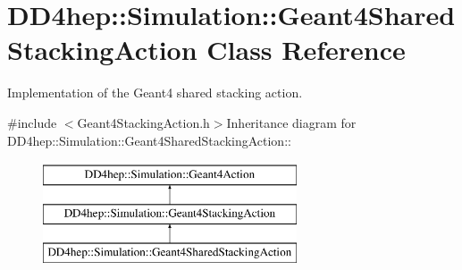 \hypertarget{class_d_d4hep_1_1_simulation_1_1_geant4_shared_stacking_action}{
\section{DD4hep::Simulation::Geant4SharedStackingAction Class Reference}
\label{class_d_d4hep_1_1_simulation_1_1_geant4_shared_stacking_action}
}


Implementation of the Geant4 shared stacking action.  


{\ttfamily \#include $<$Geant4StackingAction.h$>$}Inheritance diagram for DD4hep::Simulation::Geant4SharedStackingAction::\begin{figure}[H]
\begin{center}
\leavevmode
\includegraphics[height=3cm]{class_d_d4hep_1_1_simulation_1_1_geant4_shared_stacking_action}
\end{center}
\end{figure}
